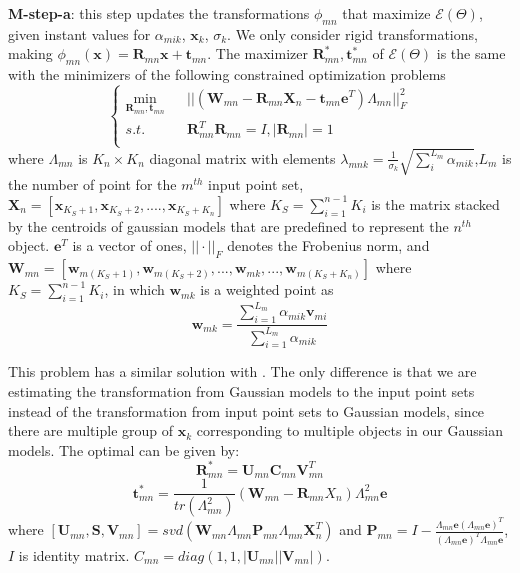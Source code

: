 \noindent\textbf{M-step-a}: this step updates the transformations $\phi_{mn}$ that maximize $\mathcal{E}(\Theta)$, given instant values for $\alpha_{mik}$, $\mathbf{x}_k$, $\sigma_k$.
%
We only consider rigid transformations, making  $\phi_{mn}(\mathbf{x})=\mathbf{R}_{mn}\mathbf{x}+\mathbf{t}_{mn}$. The maximizer $\mathbf{R}_{mn}^*,\mathbf{t}_{mn}^*$ of $\mathcal{E}(\Theta)$ is the same with the minimizers of the following constrained optimization problems
%
\begin{equation}
\left\{
\begin{array}{rcl}
\min_{\mathbf{R}_{mn},\mathbf{t}_{mn}}&      &||(\mathbf{W}_{mn}-\mathbf{R}_{mn}\mathbf{X}_n-\mathbf t_{mn}\mathbf{e}^T)\Lambda_{mn}||_F^2\\
s.t.&      &\mathbf{R}_{mn}^T\mathbf{R}_{mn}=I, |\mathbf{R}_{mn}|=1\\
\end{array} \right.
\end{equation}
where $\Lambda_{mn}$ is $K_n \times K_n$ diagonal matrix with elements $\lambda_{mnk}=\frac{1}{\sigma_k}\sqrt{\sum_i^{L_{m}}\alpha_{mik}}$,$L_m$ is the number of point for the $m^{th}$ input point set, $\mathbf{X}_n = [\mathbf{x}_{K_S+1}, \mathbf{x}_{K_S+2},...., \mathbf{x}_{K_S+K_n}]$ where $K_S = \sum_{i=1}^{n-1}K_i$ is the matrix stacked by the centroids of gaussian models that are predefined to represent the $n^{th}$ object. $\mathbf{e}^T$ is a vector of ones, $||\cdot||_F$ denotes the Frobenius norm, and $\mathbf{W}_{mn}=[\mathbf{w}_{m(K_S+1)},\mathbf{w}_{m(K_S+2)},...,\mathbf{w}_{mk},...,\mathbf{w}_{m(K_S+K_n)}]$ where $K_S = \sum_{i=1}^{n-1}K_i$, in which $\mathbf{w}_{mk}$ is a weighted point as
%
\begin{equation}
\mathbf{w}_{mk}=\frac{\sum_{i=1}^{L_m}\alpha_{mik} \mathbf{v}_{mi}}{\sum_{i=1}^{L_m}\alpha_{mik}}
\end{equation}

This problem has a similar solution with \cite{Evangelidis2014}. 
The only difference is that we are estimating the transformation from Gaussian models to the input point sets instead of the transformation from input point sets to Gaussian models, since there are multiple group of $\mathbf{x}_k$ corresponding to multiple objects in our Gaussian models. The optimal can be given by:
%
\begin{equation}
\label{equ:updateR}
\mathbf{R}_{mn}^*=\mathbf{U}_{mn}\mathbf{C}_{mn}\mathbf{V}_{mn}^T
\end{equation}
\begin{equation}
\label{equ:updatet}
\mathbf{t}_{mn}^*=\frac{1}{tr(\Lambda_{mn}^2)}(\mathbf{W}_{mn}-\mathbf{R}_{mn}X_n)\Lambda_{mn}^2\mathbf{e}
\end{equation}
where $[\mathbf{U}_{mn},\mathbf{S},\mathbf{V}_{mn}]=svd( \mathbf{W}_{mn}\Lambda_{mn}\mathbf{P}_{mn}\Lambda_{mn}\mathbf{X}_{n}^T )$ and $\mathbf{P}_{mn}=I-\frac{\Lambda_{mn}\mathbf{e}(\Lambda_{mn}\mathbf{e})^T}{(\Lambda_{mn}\mathbf{e})^T\Lambda_{mn}\mathbf{e}}$, $I$ is identity matrix. $C_{mn}=diag(1,1,|\mathbf{U}_{mn}||\mathbf{V}_{mn}|)$.

